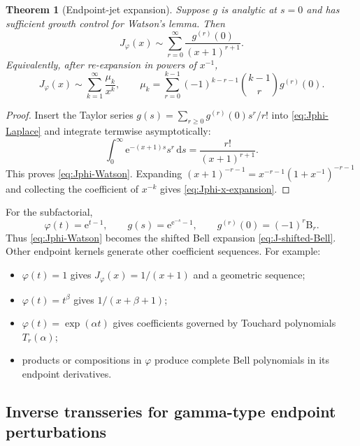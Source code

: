 \documentclass[11pt,a4paper]{article}
\numberwithin{equation}{section}
\newtheorem{theorem}{Theorem}[section]
\theoremstyle{definition}
\theoremstyle{remark}
\newcommand{\e}{\mathrm e}
\newcommand{\dd}{\,\mathrm d}
\newcommand{\Bell}{\mathrm B}
\begin{document}
\begin{theorem}[Endpoint-jet expansion]\label{thm:endpoint-jet}
Suppose $g$ is analytic at $s=0$ and has sufficient growth control for
Watson's lemma.  Then
\begin{equation}\label{eq:Jphi-Watson}
 J_\varphi(x)\sim\sum_{r=0}^{\infty}
 \frac{g^{(r)}(0)}{(x+1)^{r+1}}.
\end{equation}
Equivalently, after re-expansion in powers of $x^{-1}$,
\begin{equation}\label{eq:Jphi-x-expansion}
 J_\varphi(x)\sim\sum_{k=1}^{\infty}\frac{\mu_k}{x^k},
 \qquad
 \mu_k=\sum_{r=0}^{k-1}(-1)^{k-r-1}\binom{k-1}{r}g^{(r)}(0).
\end{equation}
\end{theorem}

\begin{proof}
Insert the Taylor series
$g(s)=\sum_{r\ge0}g^{(r)}(0)s^r/r!$ into
\eqref{eq:Jphi-Laplace} and integrate termwise asymptotically:
\[
 \int_0^\infty\e^{-(x+1)s}s^r\dd s=\frac{r!}{(x+1)^{r+1}}.
\]
This proves \eqref{eq:Jphi-Watson}.  Expanding
$(x+1)^{-r-1}=x^{-r-1}(1+x^{-1})^{-r-1}$ and collecting the coefficient of
$x^{-k}$ gives \eqref{eq:Jphi-x-expansion}.
\end{proof}

For the subfactorial,
\begin{equation}\label{eq:sub-phi-g}
 \varphi(t)=\e^{t-1},
 \qquad
 g(s)=\e^{\e^{-s}-1},
 \qquad
 g^{(r)}(0)=(-1)^r\Bell_r.
\end{equation}
Thus \eqref{eq:Jphi-Watson} becomes the shifted Bell expansion
\eqref{eq:J-shifted-Bell}.  Other endpoint kernels generate other
coefficient sequences.  For example:

\begin{itemize}
\item $\varphi(t)=1$ gives $J_\varphi(x)=1/(x+1)$ and a geometric sequence;
\item $\varphi(t)=t^\beta$ gives $1/(x+\beta+1)$;
\item $\varphi(t)=\exp(\alpha t)$ gives coefficients governed by Touchard
      polynomials $T_r(\alpha)$;
\item products or compositions in $\varphi$ produce complete Bell
      polynomials in its endpoint derivatives.
\end{itemize}

\subsection{Inverse transseries for gamma-type endpoint perturbations}
\end{document}

